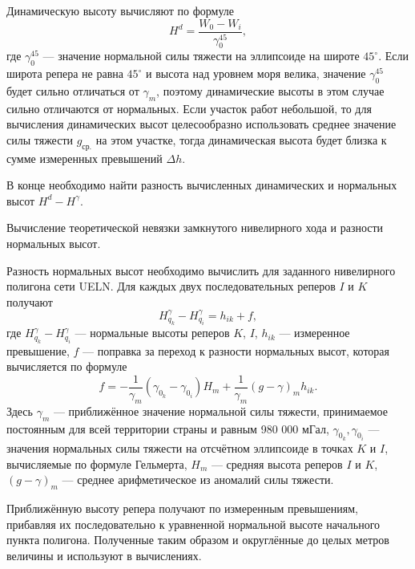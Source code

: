 \documentclass[11pt, a4paper,addpoints]{exam}
\theoremstyle{remark}
\begin{document}
\begin{questions}
    Динамическую высоту вычисляют по формуле
    \begin{equation*}
        H^d = \dfrac{W_0 - W_i}{\gamma_0^{45}},
    \end{equation*}
    где $\gamma_0^{45}$ --- значение нормальной силы тяжести на эллипсоиде на широте $45^\circ$.
    Если широта репера не равна $45^\circ$ и высота над уровнем моря велика, значение
    $\gamma_0^{45}$ будет сильно отличаться от $\gamma_m$, поэтому динамические высоты в этом случае
    сильно отличаются от нормальных. Если участок работ небольшой, то для вычисления динамических
    высот целесообразно использовать среднее значение силы тяжести $g_{\textrm{ср.}}$ на этом
    участке, тогда динамическая высота будет близка к сумме измеренных превышений $\Delta h$.

    В конце необходимо найти разность вычисленных динамических и нормальных высот $H^d - H^\gamma$.

    \question Вычисление теоретической невязки замкнутого нивелирного хода и разности нормальных высот.

    Разность нормальных высот необходимо вычислить для заданного нивелирного полигона сети UELN. Для
    каждых двух последовательных реперов $I$ и $K$ получают
    \begin{equation*}
        H^\gamma_{q_k} - H^\gamma_{q_i} = h_{ik} + f,
    \end{equation*}
    где $H^\gamma_{q_k} - H^\gamma_{q_i}$ --- нормальные высоты реперов $K$, $I$,  $h_{ik}$ ---
    измеренное превышение, $f$ --- поправка за переход к разности нормальных высот, которая
    вычисляется по формуле
    \begin{equation*}
        f = -\dfrac{1}{\gamma_m} \left( \gamma_{0_k} - \gamma_{0_i} \right) H_m +
        \dfrac{1}{\gamma_m} \left( g - \gamma \right)_m h_{ik}.
    \end{equation*}
    Здесь $\gamma_m$ --- приближённое значение нормальной силы тяжести, принимаемое постоянным для
    всей территории страны и равным 980 000 мГал, $\gamma_{0_k}, \gamma_{0_i}$ --- значения
    нормальных силы тяжести на отсчётном эллипсоиде в точках $K$ и $I$, вычисляемые по формуле
    Гельмерта, $H_m$ --- средняя высота реперов $I$ и $K$, $\left( g - \gamma \right)_m$ --- среднее
    арифметическое из аномалий силы тяжести. 

    Приближённую высоту репера получают по измеренным
    превышениям, прибавляя их последовательно к уравненной нормальной высоте начального пункта
    полигона. Полученные таким образом и округлённые до целых метров величины и используют в
    вычислениях.


\end{questions}
\end{document}
